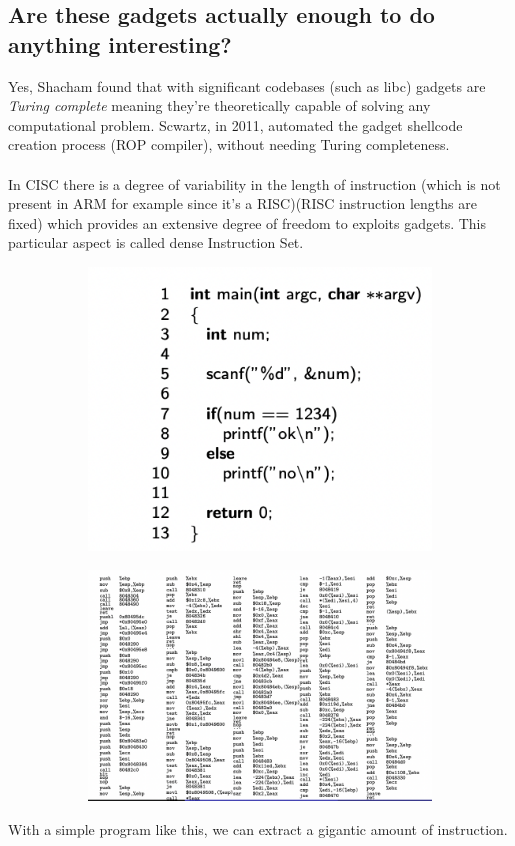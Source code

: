 \documentclass[11pt, oneside]{article}   	%
\begin{document}
\subsection*{Are these gadgets actually enough to do anything interesting?}
Yes, Shacham found that with significant codebases (such as libc) gadgets are \emph{Turing complete} meaning they're theoretically capable of solving any computational problem. Scwartz, in 2011, automated the gadget shellcode creation process (ROP compiler), without needing Turing completeness.\\\\
In CISC there is a degree of variability in the length of instruction (which is not present in ARM for example since it's a RISC)(RISC instruction lengths are fixed) which provides an extensive degree of freedom to exploits gadgets. This particular aspect is called dense Instruction Set.
\begin{figure}[H]
\begin{subfigure}[H]{0.4\linewidth}
\includegraphics[width=\linewidth]{b1}
\end{subfigure}
\begin{subfigure}[H]{0.7\linewidth}
\includegraphics[width=\linewidth]{b2}
\end{subfigure}%
\end{figure}
With a simple program like this, we can extract a gigantic amount of instruction.
\end{document}
